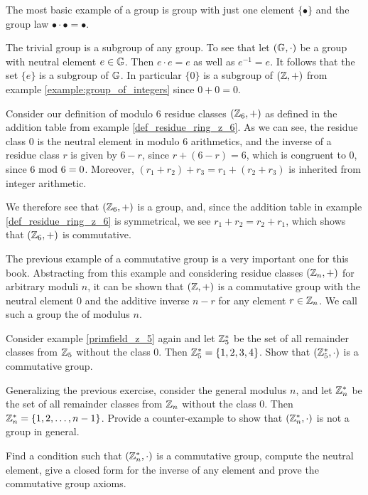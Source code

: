 \begin{example}
The most basic example of a group is group with just one element $\{\bullet\}$ and the group law $\bullet\cdot \bullet=\bullet$.

The trivial group is a subgroup of any group. To see that let $(\mathbb{G},\cdot)$ be a group with neutral element $e\in\mathbb{G}$. Then $e\cdot e = e$ as well as $e^{-1}=e$. It follows that the set $\{e\}$ is a subgroup of $\mathbb{G}$. In particular $\{0\}$ is a subgroup of $(\mathbb{Z},+)$ from example \ref{example:group_of_integers} since $0+0=0$.
\end{example}

\begin{example} Consider our definition of modulo $6$ residue classes $(\mathbb{Z}_6,+)$ as defined in the addition table from example \ref{def_residue_ring_z_6}. As we can see, the residue class $0$ is the neutral element in modulo $6$ arithmetics, and the inverse of a residue class $r$ is given by $6-r$, since $r+(6-r)=6$, which is congruent to $0$, since $6 \text{ mod } 6=0$. Moreover, $(r_1+r_2)+r_3=r_1+(r_2+r_3)$ is inherited from integer arithmetic.

We therefore see that $(\mathbb{Z}_6,+)$ is a group, and, since the addition table in example \ref{def_residue_ring_z_6} is symmetrical, we see $r_1+r_2 = r_2+r_1$, which shows that $(\mathbb{Z}_6,+)$ is commutative.
\end{example}
The previous example of a commutative group is a very important one for this book. Abstracting from this example and considering residue classes $(\mathbb{Z}_n,+)$ for arbitrary moduli $n$, it can be shown that $(\mathbb{Z},+)$ is a commutative group with the neutral element $0$ and the additive inverse $n-r$ for any element $r\in\mathbb{Z}_n$. We call such a group the  of modulus $n$.
\begin{exercise}\label{fstar} Consider example \ref{primfield_z_5} again and let $\mathbb{Z}_5^*$ be the set of all remainder classes from $\mathbb{Z}_5$ without the class $0$. Then $\mathbb{Z}_5^*=\{1,2,3,4\}$. Show that $(\mathbb{Z}_5^*,\cdot)$ is a commutative group.
\end{exercise}
\begin{exercise}\label{ex:Zn*} Generalizing the previous exercise, consider the general modulus $n$, and let $\mathbb{Z}_n^*$ be the set of all remainder classes from $\mathbb{Z}_n$ without the class $0$. Then $\mathbb{Z}_n^*=\{1,2,\ldots,n-1\}$. Provide a counter-example to show that $(\mathbb{Z}^*_n,\cdot)$ is not a group in general.

Find a condition such that $(\mathbb{Z}^*_n,\cdot)$ is a commutative group, compute the neutral element, give a closed form for the inverse of any element and prove the commutative group axioms.
\end{exercise}
